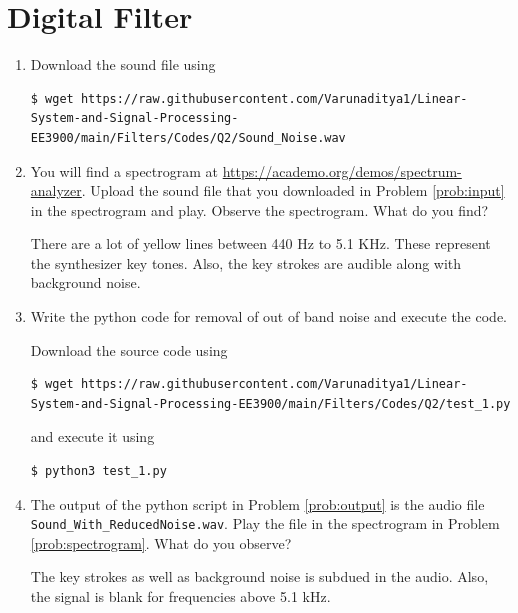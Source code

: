 \documentclass[journal,12pt,twocolumn]{IEEEtran}
\renewcommand\thesection{\arabic{section}}
\begin{document}
\section{Digital Filter}
\begin{enumerate}[label=\thesection.\arabic*
,ref=\thesection.\theenumi]
\item
\label{prob:input}
Download the sound file using
\begin{lstlisting}
$ wget https://raw.githubusercontent.com/Varunaditya1/Linear-System-and-Signal-Processing-EE3900/main/Filters/Codes/Q2/Sound_Noise.wav
\end{lstlisting}
\item
\label{prob:spectrogram}
You will find a spectrogram at \href{https://academo.org/demos/spectrum-analyzer}{\url{https://academo.org/demos/spectrum-analyzer}}. Upload the sound file that you downloaded in Problem \ref{prob:input} in the spectrogram and play. Observe the spectrogram. What do you find?

\solution There are a lot of yellow lines between 440 Hz to 5.1 KHz.  These represent the synthesizer key tones. Also, the key strokes
are audible along with background noise.
\item
\label{prob:output}
Write the python code for removal of out of band noise and execute the code.

\solution
Download the source code using
\begin{lstlisting}
$ wget https://raw.githubusercontent.com/Varunaditya1/Linear-System-and-Signal-Processing-EE3900/main/Filters/Codes/Q2/test_1.py
\end{lstlisting}
and execute it using
\begin{lstlisting}
$ python3 test_1.py
\end{lstlisting}
\item
The output of the python script in Problem \ref{prob:output} is the audio file \texttt{Sound\_With\_ReducedNoise.wav}. Play the file in the spectrogram in Problem \ref{prob:spectrogram}. What do you observe?

\solution The key strokes as well as background noise is subdued in the audio. Also, the signal is blank for frequencies above 5.1 kHz.

\end{enumerate}
\end{document}
